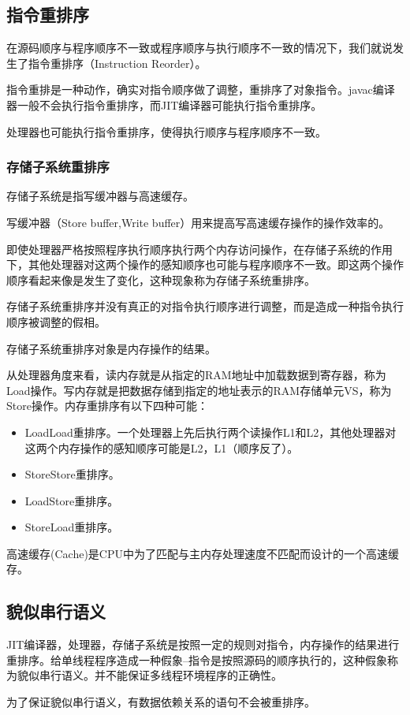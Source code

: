 \documentclass[a4paper]{report}
\begin{document}
\subsection{指令重排序}
在源码顺序与程序顺序不一致或程序顺序与执行顺序不一致的情况下，我们就说发生了指令重排序（Instruction Reorder）。

指令重排是一种动作，确实对指令顺序做了调整，重排序了对象指令。javac编译器一般不会执行指令重排序，而JIT编译器可能执行指令重排序。

处理器也可能执行指令重排序，使得执行顺序与程序顺序不一致。
\subsubsection{存储子系统重排序}
存储子系统是指写缓冲器与高速缓存。

写缓冲器（Store buffer,Write buffer）用来提高写高速缓存操作的操作效率的。

即使处理器严格按照程序执行顺序执行两个内存访问操作，在存储子系统的作用下，其他处理器对这两个操作的感知顺序也可能与程序顺序不一致。即这两个操作顺序看起来像是发生了变化，这种现象称为存储子系统重排序。

存储子系统重排序并没有真正的对指令执行顺序进行调整，而是造成一种指令执行顺序被调整的假相。

存储子系统重排序对象是内存操作的结果。

从处理器角度来看，读内存就是从指定的RAM地址中加载数据到寄存器，称为Load操作。写内存就是把数据存储到指定的地址表示的RAM存储单元VS，称为Store操作。内存重排序有以下四种可能：
\begin{itemize}
  \item LoadLoad重排序。一个处理器上先后执行两个读操作L1和L2，其他处理器对这两个内存操作的感知顺序可能是L2，L1（顺序反了）。
  \item StoreStore重排序。
  \item LoadStore重排序。
  \item StoreLoad重排序。
\end{itemize}

高速缓存(Cache)是CPU中为了匹配与主内存处理速度不匹配而设计的一个高速缓存。
\subsection{貌似串行语义}
JIT编译器，处理器，存储子系统是按照一定的规则对指令，内存操作的结果进行重排序。给单线程程序造成一种假象--指令是按照源码的顺序执行的，这种假象称为貌似串行语义。并不能保证多线程环境程序的正确性。

为了保证貌似串行语义，有数据依赖关系的语句不会被重排序。
\end{document}
